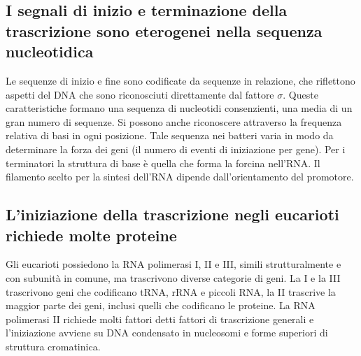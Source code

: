 \subsection{I segnali di inizio e terminazione della trascrizione sono eterogenei nella sequenza nucleotidica}
Le sequenze di inizio e fine sono codificate da sequenze in relazione, che riflettono aspetti del DNA che sono riconosciuti direttamente dal fattore $\sigma$. Queste caratteristiche 
formano una sequenza di nucleotidi consenzienti, una media di un gran numero di sequenze. Si possono anche riconoscere attraverso la frequenza relativa di basi in ogni posizione. Tale
sequenza nei batteri varia in modo da determinare la forza dei geni (il numero di eventi di iniziazione per gene). Per i terminatori la struttura di base \`e quella che forma la 
forcina nell'RNA. Il filamento scelto per la sintesi dell'RNA dipende dall'orientamento del promotore. 
\subsection{L'iniziazione della trascrizione negli eucarioti richiede molte proteine}
Gli eucarioti possiedono la RNA polimerasi I, II e III, simili strutturalmente e con subunit\`a in comune, ma trascrivono diverse categorie di geni. La I e la III trascrivono geni che 
codificano tRNA, rRNA e piccoli RNA, la II trascrive la maggior parte dei geni, inclusi quelli che codificano le proteine. La RNA polimerasi II  richiede molti fattori detti fattori di 
trascrizione generali e l'iniziazione avviene su DNA condensato in nucleosomi e forme superiori di struttura cromatinica. 
